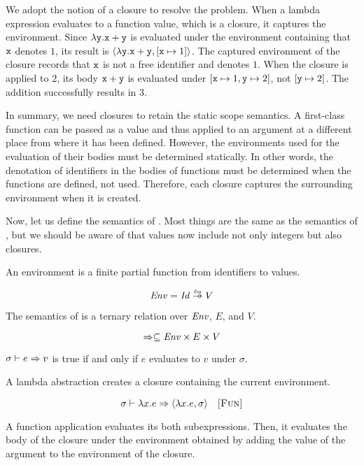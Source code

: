 We adopt the notion of a closure to resolve the problem. When a lambda
expression evaluates to a function value, which is a closure, it captures the
environment. Since $\lambda\texttt{y}.\texttt{x}+\texttt{y}$ is evaluated under the
environment containing that $\texttt{x}$ denotes $1$, its result is
$\langle\lambda\texttt{y}.\texttt{x}+\texttt{y},[\texttt{x}\mapsto1]\rangle$. The captured environment of the
closure records that $\texttt{x}$ is not a free identifier and denotes $1$.
When the closure is applied to $2$, its body ${\texttt{x}+\texttt{y}}$ is evaluated
under $[\texttt{x}\mapsto1,\texttt{y}\mapsto2]$, not $[\texttt{y}\mapsto2]$. The addition
successfully results in $3$.

In summary, we need closures to retain the static scope semantics. A first-class
function can be passed as a value and thus applied to an argument at a different
place from where it has been defined. However, the environments used for the
evaluation of their bodies must be determined statically. In other words,
the denotation of identifiers in the bodies of functions must be determined when
the functions are defined, not used. Therefore, each closure captures the surrounding
environment when it is created.

Now, let us define the semantics of \Lang. Most things are the same as the
semantics of \plang, but we should be aware of that values now include not only
integers but also closures.

An environment is a finite partial function from identifiers to values.

\[ \embox{Env}=\embox{Id}\finto V \]

The semantics of \Lang is a ternary relation over $\mbox{\emph{Env}}$, $E$, and $V$.

\[\Rightarrow\subseteq\mbox{\emph{Env}}\times E\times V\]

$\sigma\vdash e\Rightarrow v$ is true if and only if $e$ evaluates to $v$ under $\sigma$.

A lambda abstraction creates a closure containing the current environment.


\vspace{-1em}

\[
  \sigma\vdash\lambda x.e\Rightarrow\langle\lambda x.e,\sigma\rangle
  \quad\textsc{[Fun]}
\]

A function application evaluates its both subexpressions. Then, it evaluates the
body of the closure under the environment obtained by adding the value of the
argument to the environment of the closure.

